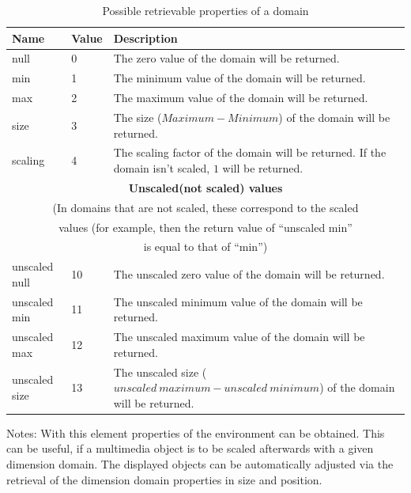 \begin{table}[htbp]
\begin{center}
\begin{tabular}{|p{35mm}|p{10mm}|p{50mm}|}\hline
	Name & Value & Description \\\hline\hline
	null & 0 & The zero value of the domain will be returned. \\\hline
	min & 1 & The minimum value of the domain will be returned. \\\hline
	max & 2 & The maximum value of the domain will be returned. \\\hline
	size & 3 & The size ($Maximum-Minimum$) of the domain will be returned.\\\hline
	scaling & 4 & The scaling factor of the domain will be returned. If the domain isn't scaled, $1$ will be returned. \\\hline
	\multicolumn{3}{|c|}{\textbf{Unscaled(not scaled) values}}\\
	\multicolumn{3}{|c|}{(In domains that are not scaled, these correspond to the scaled}\\
	\multicolumn{3}{|c|}{values (for example, then the return value of ``unscaled min''}\\
	\multicolumn{3}{|c|}{is equal to that of ``min'')}\\\hline
	unscaled null & 10 & The unscaled zero value of the domain will be returned.\\\hline
	unscaled min & 11 & The unscaled minimum value of the domain will be returned.\\\hline
	unscaled max & 12 & The unscaled maximum value of the domain will be returned.\\\hline
	unscaled size & 13 & The unscaled size ($unscaled\ maximum - unscaled\ minimum$) of the domain will be returned.\\\hline
\end{tabular} 
\end{center}
\caption{Possible retrievable properties of a domain}
\label{tableDomainPropertyModes}
\end{table}

\bigskip\noindent
Notes:
With this element properties of the environment can be obtained.
This can be useful, if a multimedia object is to be scaled afterwards with a given dimension domain. The displayed objects can be automatically adjusted via the retrieval of the dimension domain properties in size and position.

